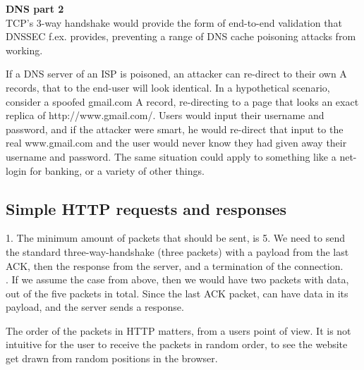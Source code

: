 \noindent \textbf{DNS part 2} \\
TCP's 3-way handshake would provide the form of end-to-end validation that DNSSEC f.ex. provides, preventing
a range of DNS cache poisoning attacks from working. 

If a DNS server of an ISP is poisoned, an attacker can re-direct to their own A records, that to the end-user will
look identical. In a hypothetical scenario, consider a spoofed gmail.com A record, re-directing to a page that looks
an exact replica of http://www.gmail.com/. Users would input their username and password, and if the attacker were smart,
he would re-direct that input to the real www.gmail.com and the user would never know they had given away their username
and password. The same situation could apply to something like a net-login for banking, or a variety of other things.

\subsection*{Simple HTTP requests and responses}
1. The minimum amount of packets that should be sent, is 5. We need to send the
standard three-way-handshake (three packets) with a payload from the last ACK,
then the response from the server, and a termination of the connection. \\

. If we assume the case from above, then we would have two packets
with data, out of the five packets in total. Since the last ACK packet, can have
data in its payload, and the server sends a response.

The order of the packets in HTTP matters, from a users point of view. It is not
intuitive for the user to receive the packets in random order, to see the website
get drawn from random positions in the browser.

